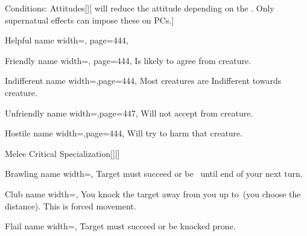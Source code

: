 \begin{PageFront}
\begin{Tables}{\frontTableHeight}
\begin{Table}{Conditions: Attitudes}[][ will reduce the attitude depending on the \GM.
        \quad Only supernatual effects can impose these on PCs.]
\begin{entry}{Helpful}{%
                name width=\conditionLength,%
                page=444,
            }
            \end{entry}
            \begin{entry}{Friendly}{%
                name width=\conditionLength,%
                page=444,
            }
                Is likely to agree  from creature. \hfill {}
            \end{entry}
            \begin{entry}{Indifferent}{%
                name width=\conditionLength,page=444,}
                Most creatures are Indifferent towards creature.
            \end{entry}
            \begin{entry}{Unfriendly}{%
                name width=\conditionLength,page=447,}
                Will not accept  from creature.
            \end{entry}
            \begin{entry}{Hostile}{%
                name width=\conditionLength,page=444,}
                Will try to harm that creature.
            \end{entry}
        \end{Table}
        \TableSpace
        \begin{Table}{Melee Critical Specialization}[][]
            \begin{entry}{Brawling}{%
                name width=\conditionLength,%
            }
                Target must succeed \Fortitude[][before=Class] or be \Slowed\, until
                end of your next turn.
            \end{entry}
            \begin{entry}{Club}{%
                name width=\conditionLength,%
            }
                You knock the target away from you up to  \Feet\,(you choose the distance). This is
                forced movement.
            \end{entry}
            \begin{entry}{Flail}{%
                name width=\conditionLength,%
            }
                Target must succeed \Reflex[][before=Class] or be knocked prone.

\end{entry}
\end{Table}
\end{Tables}
\end{PageFront}
